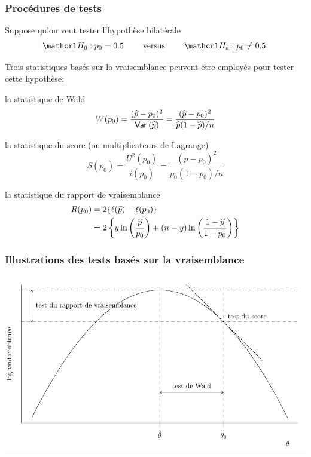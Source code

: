 \documentclass{beamer}
\begin{document}
\begin{frame}
 \frametitle{Procédures de tests}
 Suppose qu'on veut tester l'hypothèse bilatérale
 \[\Hy_0: p_0 = 0.5 \qquad \text{ versus } \qquad \Hy_a: p_0 \neq 0.5.\]
 
 Trois statistiques basés sur la vraisemblance peuvent être employés pour tester cette hypothèse:
 \bi \item 
la statistique de Wald 
  \[W(p_0) = \frac{(\widehat{p} - p_0)^2}{{\mathsf{Var}_{}}\left(\widehat{p}\right)} = \frac{(\widehat{p}-p_0)^2}{\widehat{p}(1-\widehat{p})/n}\]
  \item  la statistique du score (ou multiplicateurs de Lagrange)
  \[S(p_0) = \frac{U^2(p_0)}{i(p_0)} = \frac{(\widehat{p}-p_0)^2}{p_0(1-p_0)/n}\]
 \item la statistique du rapport de vraisemblance
 \begin{align*}
  R(p_0) &= 2\{\ell(\widehat{p}) - \ell(p_0)\} 
  \\&= 2 \left\{ y\ln \left(\frac{\widehat{p}}{p_0}\right) + (n-y)\ln\left(\frac{1-\widehat{p}}{1-p_0}\right)\right\}
 \end{align*}
\ei
 \end{frame}
  \begin{frame}
 \frametitle{Illustrations des tests basés sur la vraisemblance}
 \begin{center}
  \includegraphics[width = \linewidth]{img/c3/likelihood_tests_fr}
 \end{center}
\end{frame}
\end{document}
